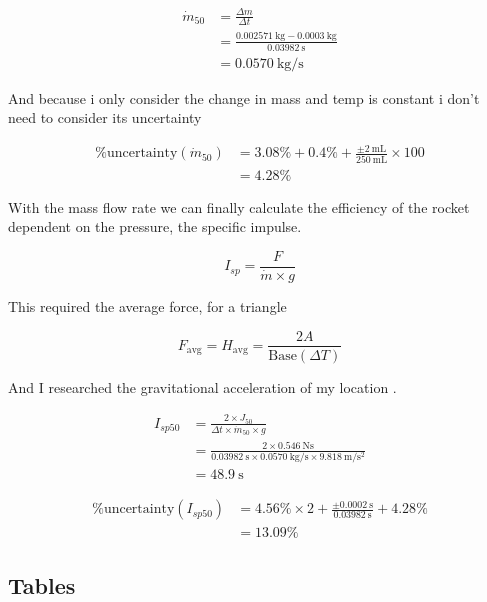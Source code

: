 \documentclass[12pt,a4paper]{article}
\begin{document}
\begin{align}
\dot{m}_{50} &= \frac{\Delta m}{\Delta t} \\
&= \frac{\SI{0.002571}{\kilo\gram} - \SI{0.0003}{\kilo\gram}}{\SI{0.03982}{\second}} \\
&= \SI{0.0570}{\kilo\gram\per\second}
\end{align}

And because i only consider the change in mass and temp is constant i don't need to consider its uncertainty

\begin{align}
\%\text{uncertainty}(\dot{m}_{50}) &= 3.08\% + 0.4\% + \frac{\pm \SI{2}{\milli\liter}}{\SI{250}{\milli\liter}} \times 100 \\
&= 4.28\%
\end{align}

With the mass flow rate we can finally calculate the efficiency of the rocket dependent on the pressure, the specific impulse.

\begin{equation}
I_{sp} = \frac{F}{\dot{m} \times g}
\end{equation}

This required the average force, for a triangle

\begin{equation}
F_{\text{avg}} = H_{\text{avg}} = \frac{2A}{\text{Base}(\Delta T)}
\end{equation}

And I researched the gravitational acceleration of my location \cite{ref15}.

\begin{align}
I_{sp50} &= \frac{2 \times J_{50}}{\Delta t \times \dot{m}_{50} \times g} \\
&= \frac{2 \times \SI{0.546}{\newton\second}}{\SI{0.03982}{\second} \times \SI{0.0570}{\kilo\gram\per\second} \times \SI{9.818}{\meter\per\second\squared}} \\
&= \SI{48.9}{\second}
\end{align}

\begin{align}
\%\text{uncertainty}(I_{sp50}) &= 4.56\% \times 2 + \frac{\pm \SI{0.0002}{\second}}{\SI{0.03982}{\second}} + 4.28\% \\
&= 13.09\%
\end{align}

\subsection{Tables}
\end{document}
